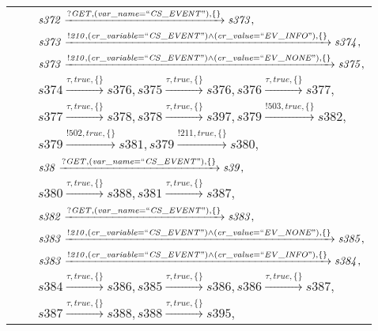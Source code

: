 \begin{tabular}{lcl}
& & $\mathit{s372}\xrightarrow{\mathit{?GET}, \mathit{(var\_name = ``CS\_EVENT")}, \{\}}\mathit{s373},$ \\
& & $\mathit{s373}\xrightarrow{\mathit{!210}, \mathit{(cr\_variable = ``CS\_EVENT") \land (cr\_value = ``EV\_INFO")}, \{\}}\mathit{s374},$ \\
& & $\mathit{s373}\xrightarrow{\mathit{!210}, \mathit{(cr\_variable = ``CS\_EVENT") \land (cr\_value = ``EV\_NONE")}, \{\}}\mathit{s375},$ \\
& & $\mathit{s374}\xrightarrow{\mathit{\tau}, \mathit{true}, \{\}}\mathit{s376},\mathit{s375}\xrightarrow{\mathit{\tau}, \mathit{true}, \{\}}\mathit{s376},\mathit{s376}\xrightarrow{\mathit{\tau}, \mathit{true}, \{\}}\mathit{s377},$ \\
& & $\mathit{s377}\xrightarrow{\mathit{\tau}, \mathit{true}, \{\}}\mathit{s378},\mathit{s378}\xrightarrow{\mathit{\tau}, \mathit{true}, \{\}}\mathit{s397},\mathit{s379}\xrightarrow{\mathit{!503}, \mathit{true}, \{\}}\mathit{s382},$ \\
& & $\mathit{s379}\xrightarrow{\mathit{!502}, \mathit{true}, \{\}}\mathit{s381},\mathit{s379}\xrightarrow{\mathit{!211}, \mathit{true}, \{\}}\mathit{s380},$ \\
& & $\mathit{s38}\xrightarrow{\mathit{?GET}, \mathit{(var\_name = ``CS\_EVENT")}, \{\}}\mathit{s39},$ \\
& & $\mathit{s380}\xrightarrow{\mathit{\tau}, \mathit{true}, \{\}}\mathit{s388},\mathit{s381}\xrightarrow{\mathit{\tau}, \mathit{true}, \{\}}\mathit{s387},$ \\
& & $\mathit{s382}\xrightarrow{\mathit{?GET}, \mathit{(var\_name = ``CS\_EVENT")}, \{\}}\mathit{s383},$ \\
& & $\mathit{s383}\xrightarrow{\mathit{!210}, \mathit{(cr\_variable = ``CS\_EVENT") \land (cr\_value = ``EV\_NONE")}, \{\}}\mathit{s385},$ \\
& & $\mathit{s383}\xrightarrow{\mathit{!210}, \mathit{(cr\_variable = ``CS\_EVENT") \land (cr\_value = ``EV\_INFO")}, \{\}}\mathit{s384},$ \\
& & $\mathit{s384}\xrightarrow{\mathit{\tau}, \mathit{true}, \{\}}\mathit{s386},\mathit{s385}\xrightarrow{\mathit{\tau}, \mathit{true}, \{\}}\mathit{s386},\mathit{s386}\xrightarrow{\mathit{\tau}, \mathit{true}, \{\}}\mathit{s387},$ \\
& & $\mathit{s387}\xrightarrow{\mathit{\tau}, \mathit{true}, \{\}}\mathit{s388},\mathit{s388}\xrightarrow{\mathit{\tau}, \mathit{true}, \{\}}\mathit{s395},$ \\

\end{tabular}
